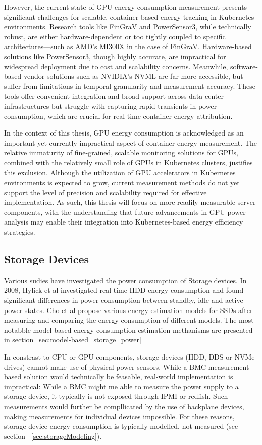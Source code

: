 However, the current state of GPU energy consumption measurement presents significant challenges for scalable, container-based energy tracking in Kubernetes environments. Research tools like FinGraV and PowerSensor3, while technically robust, are either hardware-dependent or too tightly coupled to specific architectures—such as AMD's MI300X in the case of FinGraV. Hardware-based solutions like PowerSensor3, though highly accurate, are impractical for widespread deployment due to cost and scalability concerns. Meanwhile, software-based vendor solutions such as NVIDIA's NVML are far more accessible, but suffer from limitations in temporal granularity and measurement accuracy. These tools offer convenient integration and broad support across data center infrastructures but struggle with capturing rapid transients in power consumption, which are crucial for real-time container energy attribution. 

In the context of this thesis, GPU energy consumption is acknowledged as an important yet currently impractical aspect of container energy measurement. The relative immaturity of fine-grained, scalable monitoring solutions for GPUs, combined with the relatively small role of GPUs in Kubernetes clusters, justifies this exclusion. Although the utilization of GPU accelerators in Kubernetes environments is expected to grow, current measurement methods do not yet support the level of precision and scalability required for effective implementation. As such, this thesis will focus on more readily measurable server components, with the understanding that future advancements in GPU power analysis may enable their integration into Kubernetes-based energy efficiency strategies.

\subsection{Storage Devices}
Various sudies have investigated the power consumption of Storage devices. In 2008, Hylick et al\parencite{hylickAnalysisHardDrive2008a} investigated real-time HDD energy consumption and found significant differences in power consumption between standby, idle and active power states. Cho et al\parencite{choDesignTradeoffsSSDs2015} propose various energy estimation models for SSDs after measuring and comparing the energy consumption of different models. The most notabble model-based energy consumption estimation methanisms are presented in section~\ref{sec:model-based_storage_power}

In constrast to CPU or GPU components, storage devices (HDD, DDS or NVMe-drives) cannot make use of physical power sensors. While a BMC-measurement-based solution would technically be feasable, real-world implementation is impractical: While a BMC might me able to measure the power supply to a storage device, it typically is not exposed through IPMI or redfish. Such measurements would further be compllicated by the use of backplane devices, making measurements for individual devices impossible. For these reasons, storage device energy consumption is typically modelled, not measured (see section ~\ref{sec:storageModeling}).

